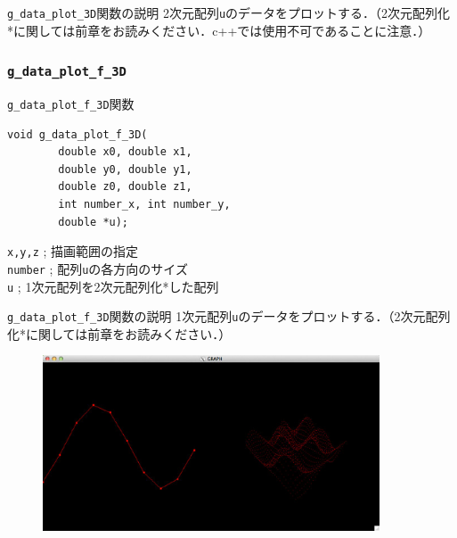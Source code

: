 \documentclass[platex,a4paper,12pt]{jsarticle}%
\begin{document}
\begin{itembox}[l]{\texttt{g\_data\_plot\_3D}関数の説明}
2次元配列\verb|u|のデータをプロットする．（2次元配列化*に関しては前章をお読みください．c++では使用不可であることに注意．）
\end{itembox}

\begin{figure}[htb]
\end{figure}




\clearpage
\subsubsection{\texttt{g\_data\_plot\_f\_3D}}

\begin{itembox}[l]{\texttt{g\_data\_plot\_f\_3D}関数}
\begin{verbatim}
void g_data_plot_f_3D(
        double x0, double x1,
        double y0, double y1,
        double z0, double z1,
        int number_x, int number_y,
        double *u);
\end{verbatim}
\verb|x,y,z| ; 描画範囲の指定\\
\verb|number| ; 配列\verb|u|の各方向のサイズ\\
\verb|u| ; 1次元配列を2次元配列化*した配列
\end{itembox}

\begin{itembox}[l]{\texttt{g\_data\_plot\_f\_3D}関数の説明}
1次元配列\verb|u|のデータをプロットする．（2次元配列化*に関しては前章をお読みください．）
\end{itembox}

\begin{figure}[htb]
	\includegraphics[width=100mm]{./Figures/eps/Canvas_g_data_plot.eps}
\end{figure}
\end{document}
